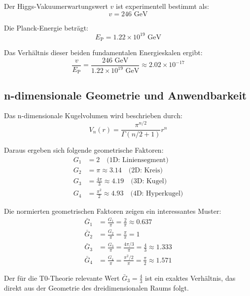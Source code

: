 \documentclass[12pt,a4paper]{article}
\newcommand{\ep}{E_{\text{P}}}
\theoremstyle{definition}
\begin{document}
	Der Higgs-Vakuumerwartungswert $v$ ist experimentell bestimmt als:
	\begin{equation}
		v = 246 \text{ GeV}
	\end{equation}
	
	Die Planck-Energie beträgt:
	\begin{equation}
		\ep = 1.22 \times 10^{19} \text{ GeV}
	\end{equation}
	
	Das Verhältnis dieser beiden fundamentalen Energieskalen ergibt:
	\begin{equation}
		\frac{v}{\ep} = \frac{246 \text{ GeV}}{1.22 \times 10^{19} \text{ GeV}} \approx 2.02 \times 10^{-17}
	\end{equation}
	
	\subsection{n-dimensionale Geometrie und Anwendbarkeit}
	
	Das n-dimensionale Kugelvolumen wird beschrieben durch:
	\begin{equation}
		V_n(r) = \frac{\pi^{n/2}}{\Gamma(n/2 + 1)} r^n
	\end{equation}
	
	Daraus ergeben sich folgende geometrische Faktoren:
	\begin{align}
		G_1 &= 2 \quad \text{(1D: Liniensegment)}\\
		G_2 &= \pi \approx 3.14 \quad \text{(2D: Kreis)}\\
		G_3 &= \frac{4\pi}{3} \approx 4.19 \quad \text{(3D: Kugel)}\\
		G_4 &= \frac{\pi^2}{2} \approx 4.93 \quad \text{(4D: Hyperkugel)}
	\end{align}
	
	\begin{verhaltnis}
		Die normierten geometrischen Faktoren zeigen ein interessantes Muster:
		\begin{align}
			\bar{G}_1 &= \frac{G_1}{\pi} = \frac{2}{\pi} \approx 0.637\\
			\bar{G}_2 &= \frac{G_2}{\pi} = \frac{\pi}{\pi} = 1\\
			\bar{G}_3 &= \frac{G_3}{\pi} = \frac{4\pi/3}{\pi} = \frac{4}{3} \approx 1.333\\
			\bar{G}_4 &= \frac{G_4}{\pi} = \frac{\pi^2/2}{\pi} = \frac{\pi}{2} \approx 1.571
		\end{align}
		
		Der für die T0-Theorie relevante Wert $\bar{G}_3 = \frac{4}{3}$ ist ein exaktes Verhältnis, das direkt aus der Geometrie des dreidimensionalen Raums folgt.
	\end{verhaltnis}
	
\end{document}
